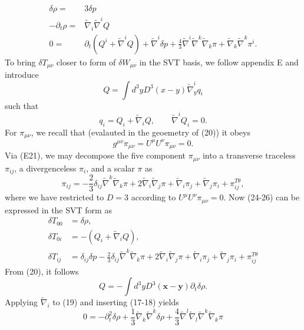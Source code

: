 \documentclass[10pt,letterpaper]{article}
\begin{document}
\begin{align}
 \delta \rho =&{} 3\delta p\\
-\partial_t\rho = &{} \tilde\nabla_i \tilde\nabla^i Q\\
0 = &{} \partial_t (Q^i + \tilde\nabla^i Q) + \tilde\nabla^i \delta p +\frac43 \tilde\nabla^i \tilde\nabla^k \tilde\nabla_k \pi + \tilde\nabla_k \tilde\nabla^k \pi^i.
\end{align}
To bring $\delta T_{\mu\nu}$ closer to form of $\delta W_{\mu\nu}$ in the SVT basis, we follow appendix E and introduce
\begin{equation}
	Q = \int d^3y D^3(x-y) \tilde\nabla^i_y q_i
\end{equation}
such that
\begin{equation}
	 q_i = Q_i + \tilde\nabla_i Q,\qquad \tilde\nabla^i Q_i = 0.
\end{equation}
For $\pi_{\mu\nu}$, we recall that (evalauted in the geoemetry of (20)) it obeys 
\begin{equation}
	g^{\mu\nu}\pi_{\mu\nu} = U^\mu U^\nu \pi_{\mu\nu} = 0.
\end{equation} 
Via (E21), we may decompose the five component $\pi_{\mu\nu}$ into a transverse traceless $\pi_{ij}$, a divergenceless $\pi_i$, and a scalar $\pi$ as
\begin{equation}
	\pi_{ij} = -\frac{2}{3} \delta_{ij}\tilde\nabla^k \tilde\nabla_k \pi  + 2\tilde\nabla_i\tilde\nabla_j \pi + \tilde\nabla_i \pi_j + \tilde\nabla_j \pi_i + \pi_{ij}^{T\theta},
\end{equation}
where we have restricted to $D=3$ according to $U^\mu U^\nu \pi_{\mu\nu} = 0$. Now (24-26) can be expressed in the SVT form as
\begin{align}
\delta T_{00}  &= \delta \rho,
\nonumber\\	
\delta T_{0i} &= - ( Q_i + \tilde\nabla_i Q),
\nonumber\\	
\delta T_{ij}  &=\delta_{ij} \delta p -\frac{2}{3} \delta_{ij}\tilde\nabla^k \tilde\nabla_k \pi + 2\tilde\nabla_i\tilde\nabla_j \pi + \tilde\nabla_i \pi_j + \tilde\nabla_j \pi_i + \pi_{ij}^{T\theta}
\end{align} 
From (20), it follows
\begin{equation}
Q = -\int d^3y D^3(\mathbf x-\mathbf y) \partial_t \delta \rho.
\end{equation}
Applying $\tilde\nabla_i$ to (19) and inserting (17-18) yields
\begin{equation}
	0 = -\partial_t^2 \delta \rho + \frac13 \tilde\nabla_k\tilde\nabla^k \delta\rho + \frac43 \tilde\nabla^l \tilde\nabla_l \tilde\nabla^k \tilde\nabla_k \pi
\end{equation}
\end{document}
